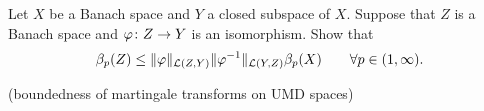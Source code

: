 \begin{exercise}\label{ex:UMD-isomorphism}
  Let $X$ be a Banach space and $Y$ a closed subspace of $X$.
  Suppose that $Z$ is a Banach space and $\varphi \colon Z \rightarrow Y$ is an isomorphism.
  Show that 
  \begin{equation*}
    \beta_{p}(Z) \leq \|\varphi\|_{\mathcal{L}(Z,Y)} \|\varphi^{-1}\|_{\mathcal{L}(Y,Z)} \beta_{p}(X) \qquad \forall p \in (1,\infty).
  \end{equation*}
\end{exercise}

\begin{exercise}
  (boundedness of martingale transforms on UMD spaces)
\end{exercise}


